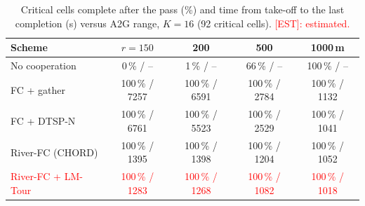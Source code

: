\begin{table}[t]\centering\color{blue}\caption{Critical cells complete after the pass (\%) and time from take-off to the last completion (s) versus A2G range, $K = 16$ (92 critical cells). \textcolor{red}{[EST]: estimated.}}\label{tab:complete}
\footnotesize\begin{tabular}{lcccc}\toprule
Scheme & $r=150$ & 200 & 500 & 1000\,m \\\midrule
No cooperation & 0\,\% / -- & 1\,\% / -- & 66\,\% / -- & 100\,\% / -- \\
FC + gather & 100\,\% / 7257 & 100\,\% / 6591 & 100\,\% / 2784 & 100\,\% / 1132 \\
FC + DTSP-N & 100\,\% / 6761 & 100\,\% / 5523 & 100\,\% / 2529 & 100\,\% / 1041 \\
River-FC (CHORD) & 100\,\% / 1395 & 100\,\% / 1398 & 100\,\% / 1204 & 100\,\% / 1052 \\
\textcolor{red}{River-FC + LM-Tour} & \textcolor{red}{100\,\% / 1283} & \textcolor{red}{100\,\% / 1268} & \textcolor{red}{100\,\% / 1082} & \textcolor{red}{100\,\% / 1018} \\
\bottomrule\end{tabular}\end{table}
